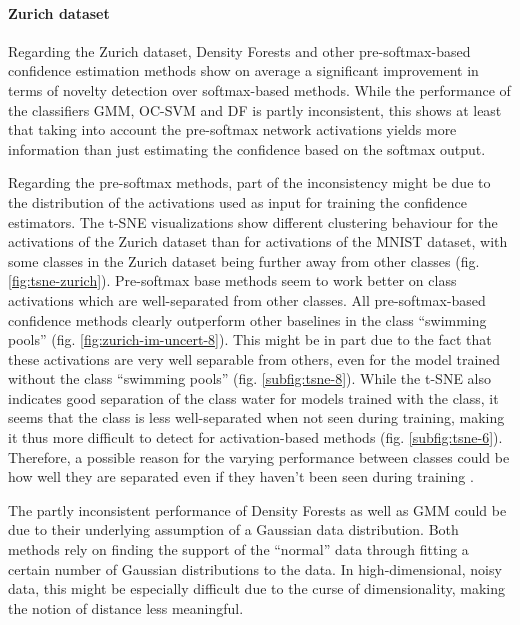 \documentclass[10pt]{article}
\begin{document}
\paragraph{Zurich dataset} Regarding the Zurich dataset, Density Forests and other pre-softmax-based confidence estimation methods show on average a significant improvement in terms of novelty detection over softmax-based methods. While the performance of the classifiers \gls{GMM}, \gls{OC-SVM} and \gls{DF} is partly inconsistent, this shows at least that taking into account the pre-softmax network activations yields more information than just estimating the confidence based on the softmax output.


Regarding the pre-softmax methods, part of the inconsistency might be due to the distribution of the activations used as input for training the confidence estimators. The \gls{t-SNE} visualizations show different clustering behaviour for the activations of the Zurich dataset than for activations of the MNIST dataset, with some classes in the Zurich dataset being further away from other classes (fig. \ref{fig:tsne-zurich}). Pre-softmax base methods seem to work better on class activations which are well-separated from other classes. All pre-softmax-based confidence methods clearly outperform other baselines in the class ``swimming pools'' (fig. \ref{fig:zurich-im-uncert-8}). This might be in part due to the fact that these activations are very well separable from others, even for the model trained without the class ``swimming pools'' (fig. \ref{subfig:tsne-8}). While the \gls{t-SNE} also indicates good separation of the class water for models trained with the class, it seems that the class is less well-separated when not seen during training, making it thus more difficult to detect for activation-based methods (fig. \ref{subfig:tsne-6}). Therefore, a possible reason for the varying performance between classes could be how well they are separated even if they haven't been seen during training .

The partly inconsistent performance of Density Forests as well as \gls{GMM} could be due to their underlying assumption of a Gaussian data distribution. Both methods rely on finding the support of the ``normal'' data through fitting a certain number of Gaussian distributions to the data. In high-dimensional, noisy data, this might be especially difficult due to the curse of dimensionality, making the notion of distance less meaningful.
\end{document}
